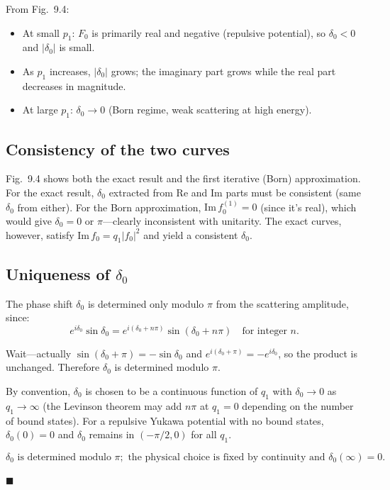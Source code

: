 \documentclass[12pt]{article}
\begin{document}
From Fig.~9.4:
\begin{itemize}
\item At small $p_1$: $F_0$ is primarily real and negative (repulsive potential), so $\delta_0 < 0$ and $|\delta_0|$ is small.
\item As $p_1$ increases, $|\delta_0|$ grows; the imaginary part grows while the real part decreases in magnitude.
\item At large $p_1$: $\delta_0 \to 0$ (Born regime, weak scattering at high energy).
\end{itemize}

\subsection*{Consistency of the two curves}

Fig.~9.4 shows both the exact result and the first iterative (Born) approximation. For the exact result, $\delta_0$ extracted from Re and Im parts must be consistent (same $\delta_0$ from either). For the Born approximation, $\mathrm{Im}\,f_0^{(1)} = 0$ (since it's real), which would give $\delta_0 = 0$ or $\pi$---clearly inconsistent with unitarity. The exact curves, however, satisfy $\mathrm{Im}\,f_0 = q_1|f_0|^2$ and yield a consistent $\delta_0$.

\subsection*{Uniqueness of $\delta_0$}

The phase shift $\delta_0$ is determined only modulo $\pi$ from the scattering amplitude, since:
\[
e^{i\delta_0}\sin\delta_0 = e^{i(\delta_0 + n\pi)}\sin(\delta_0 + n\pi) \quad \text{for integer } n.
\]

Wait---actually $\sin(\delta_0 + \pi) = -\sin\delta_0$ and $e^{i(\delta_0+\pi)} = -e^{i\delta_0}$, so the product is unchanged. Therefore $\delta_0$ is determined modulo $\pi$.

By convention, $\delta_0$ is chosen to be a continuous function of $q_1$ with $\delta_0 \to 0$ as $q_1 \to \infty$ (the Levinson theorem may add $n\pi$ at $q_1 = 0$ depending on the number of bound states). For a repulsive Yukawa potential with no bound states, $\delta_0(0) = 0$ and $\delta_0$ remains in $(-\pi/2, 0)$ for all $q_1$.

\[
\boxed{\delta_0 \text{ is determined modulo } \pi; \text{ the physical choice is fixed by continuity and } \delta_0(\infty) = 0.}
\]

\hfill $\blacksquare$
\end{document}
